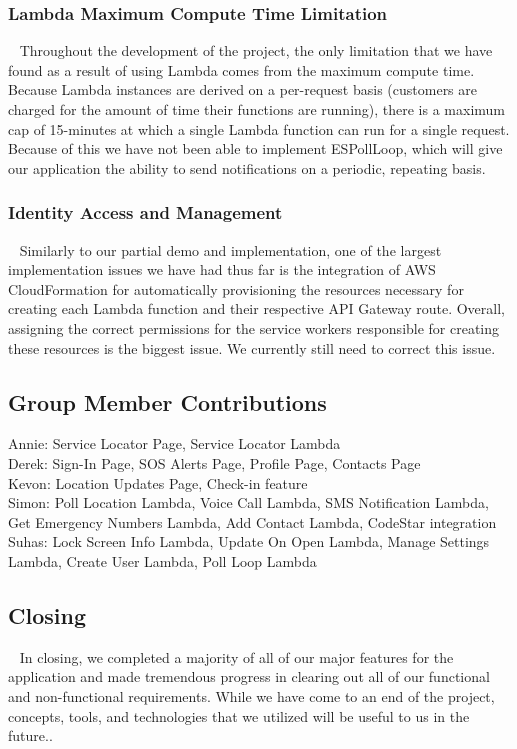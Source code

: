\documentclass[10pt, a4paper]{article}
\begin{document}
\subsubsection{Lambda Maximum Compute Time Limitation}
\par ~ Throughout the development of the project, the only limitation that we have found as a result of using Lambda comes from the maximum compute time. Because Lambda instances are derived on a per-request basis (customers are charged for the amount of time their functions are running), there is a maximum cap of 15-minutes at which a single Lambda function can run for a single request. Because of this we have not been able to implement ESPollLoop, which will give our application the ability to send notifications on a periodic, repeating basis.

\subsubsection{Identity Access and Management}
\par ~ Similarly to our partial demo and implementation, one of the largest implementation issues we have had thus far is the integration of AWS CloudFormation for automatically provisioning the resources necessary for creating each Lambda function and their respective API Gateway route. Overall, assigning the correct permissions for the service workers responsible for creating these resources is the biggest issue. We currently still need to correct this issue.

\subsection{Group Member Contributions}
Annie: Service Locator Page, Service Locator Lambda \\
Derek: Sign-In Page, SOS Alerts Page, Profile Page, Contacts Page \\
Kevon: Location Updates Page, Check-in feature \\
Simon: Poll Location Lambda, Voice Call Lambda, SMS Notification Lambda, Get Emergency Numbers Lambda, Add Contact Lambda, CodeStar integration \\
Suhas: Lock Screen Info Lambda, Update On Open Lambda, Manage Settings Lambda, Create User Lambda, Poll Loop Lambda \\

\subsection{Closing}
\par ~ In closing, we completed a majority of all of our major features for the application and made tremendous progress in clearing out all of our functional and non-functional requirements. While we have come to an end of the project, concepts, tools, and technologies that we utilized will be useful to us in the future..
\end{document}
